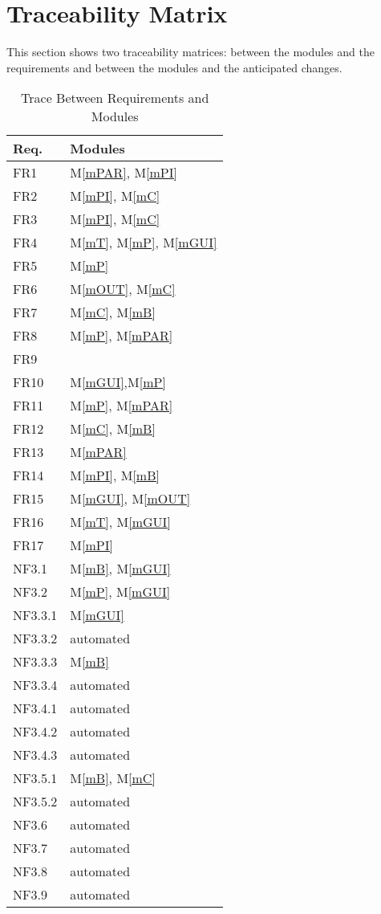 \documentclass[12pt, titlepage]{article}
\newcommand{\mref}[1]{M\ref{#1}}
\begin{document}
\section{Traceability Matrix} \label{SecTM}

This section shows two traceability matrices: between the modules and the
requirements and between the modules and the anticipated changes.

\begin{table}[H]
\centering
\begin{tabular}{p{} p{}}
\toprule
\textbf{Req.} & \textbf{Modules}\\
\midrule
FR1 & \mref{mPAR}, \mref{mPI}\\
FR2 & \mref{mPI}, \mref{mC}\\
FR3 & \mref{mPI}, \mref{mC}\\
FR4 & \mref{mT}, \mref{mP}, \mref{mGUI}\\
FR5 & \mref{mP}\\
FR6 & \mref{mOUT}, \mref{mC}\\
FR7 & \mref{mC}, \mref{mB}\\
FR8 & \mref{mP}, \mref{mPAR}\\
FR9 & \\
FR10 & \mref{mGUI},\mref{mP}\\
FR11 & \mref{mP}, \mref{mPAR}\\
FR12 & \mref{mC}, \mref{mB}\\
FR13 & \mref{mPAR}\\
FR14 & \mref{mPI}, \mref{mB}\\
FR15 & \mref{mGUI}, \mref{mOUT}\\
FR16 & \mref{mT}, \mref{mGUI}\\
FR17 & \mref{mPI}\\


NF3.1 & \mref{mB}, \mref{mGUI}\\
NF3.2 & \mref{mP}, \mref{mGUI}\\
NF3.3.1 & \mref{mGUI}\\
NF3.3.2 & automated\\
NF3.3.3 & \mref{mB}\\
NF3.3.4 & automated\\
NF3.4.1 & automated\\ 
NF3.4.2 & automated\\
NF3.4.3 & automated\\
NF3.5.1 & \mref{mB}, \mref{mC}\\
NF3.5.2 & automated\\
NF3.6 & automated\\
NF3.7 & automated\\
NF3.8 & automated\\
NF3.9 & automated\\

\bottomrule
\end{tabular}
\textcolor{red}{\caption{Trace Between Requirements and Modules}}
\label{TblRT}
\end{table}
\end{document}

